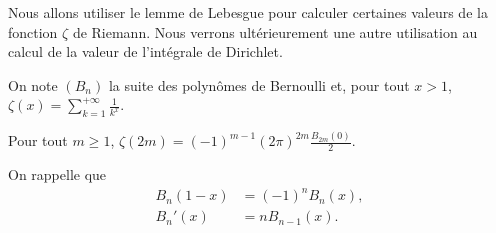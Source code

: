 %
%


\bigskip



Nous allons utiliser le lemme de Lebesgue pour calculer certaines valeurs de la fonction $\zeta$ de Riemann. Nous verrons ultérieurement une autre utilisation au calcul de la valeur de l'intégrale de Dirichlet.





On note $(B_n)$ la suite des polynômes de Bernoulli et, pour tout $x > 1$, $\zeta(x) = \sum\limits_{k=1}^{+\infty} \frac{1}{k^x}$.

\begin{theo}
Pour tout $m \geq 1$, $\zeta(2m) = (-1)^{m-1} (2 \pi)^{2m} \frac{B_{2m}(0)}{2}$.
\end{theo}

On rappelle que 
\begin{align*}
B_n(1 - x) &= (-1)^n B_n(x),\\
B_n'(x) &= n B_{n-1}(x).
\end{align*}

